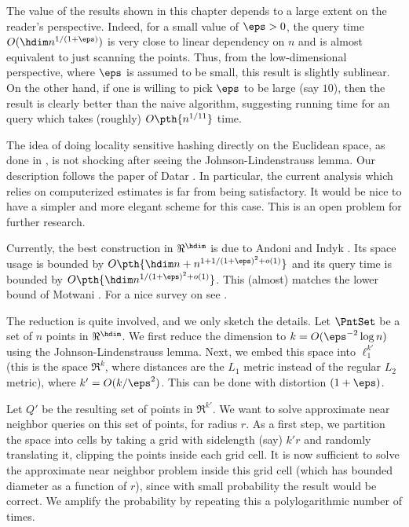 The value of the results shown in this chapter depends to a large
extent on the reader's perspective. Indeed, for a small value of $\eps
> 0$, the query time $O( \hdim n^{1/(1+\eps)})$ is very close to
linear dependency on $n$ and is almost equivalent to just scanning the
points. Thus, from the low-dimensional perspective, where $\eps$ is
assumed to be small, this result is slightly sublinear. On the other
hand, if one is willing to pick $\eps$ to be large (say $10$), then
the result is clearly better than the naive algorithm, suggesting
running time for an \ANNbr query which takes (roughly) $O\pth{
   n^{1/11} }$ time.

The idea of doing locality sensitive hashing directly on the Euclidean
space, as done in , is not shocking after seeing
the Johnson-Lindenstrauss lemma. Our description follows the paper of
Datar \etal{} \cite{diim-lshsb-04}. In particular, the current
analysis which relies on computerized estimates is far from being
satisfactory. It would be nice to have a simpler and more elegant
scheme for this case. This is an open problem for further research.

Currently, the best \LSH construction in $\Re^\hdim$ is due to Andoni
and Indyk \cite{ai-nohaa-06}. Its space usage is bounded by $O
\pth{\hdim n + n^{1 + 1/(1+\eps)^2 + o(1)}}$ and its query time is
bounded by $O\pth{ \hdim n^{1/(1+\eps)^2 +o(1)}}$. This (almost)
matches the lower bound of Motwani \etal \cite{mnp-lblsh-06}. For a
nice survey on \LSH see \cite{ai-nohaa-08}.




The reduction is quite involved, and we only sketch the details. Let
$\PntSet$ be a set of $n$ points in $\Re^\hdim$. We first reduce the
dimension to $k = O(\eps^{-2} \log n)$ using the Johnson-Lindenstrauss
lemma. Next, we embed this space into $\ell^{k'}_1$ (this is the space
$\Re^k$, where distances are the $L_1$ metric instead of the regular
$L_2$ metric), where $k'=O(k/\eps^2)$. This can be done with
distortion $(1+\eps)$.

Let $Q'$ be the resulting set of points in $\Re^{k'}$. We want to
solve approximate near neighbor queries on this set of points, for
radius $r$. As a first step, we partition the space into cells by
taking a grid with sidelength (say) $k'r$ and randomly translating it,
clipping the points inside each grid cell. It is now sufficient to
solve the approximate near neighbor problem inside this grid cell
(which has bounded diameter as a function of $r$), since with small
probability the result would be correct. We amplify the probability by
repeating this a polylogarithmic number of times.
   
